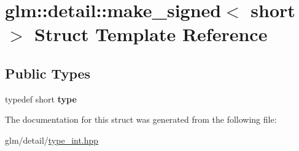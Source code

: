 \hypertarget{structglm_1_1detail_1_1make__signed_3_01short_01_4}{\section{glm\-:\-:detail\-:\-:make\-\_\-signed$<$ short $>$ Struct Template Reference}
\label{structglm_1_1detail_1_1make__signed_3_01short_01_4}
}
\subsection*{Public Types}
\begin{DoxyCompactItemize}
\item 
\hypertarget{structglm_1_1detail_1_1make__signed_3_01short_01_4_a9488d8ffbd34998675456fa6d1143989}{typedef short {\bfseries type}}\label{structglm_1_1detail_1_1make__signed_3_01short_01_4_a9488d8ffbd34998675456fa6d1143989}

\end{DoxyCompactItemize}


The documentation for this struct was generated from the following file\-:\begin{DoxyCompactItemize}
\item 
glm/detail/\hyperlink{type__int_8hpp}{type\-\_\-int.\-hpp}\end{DoxyCompactItemize}
